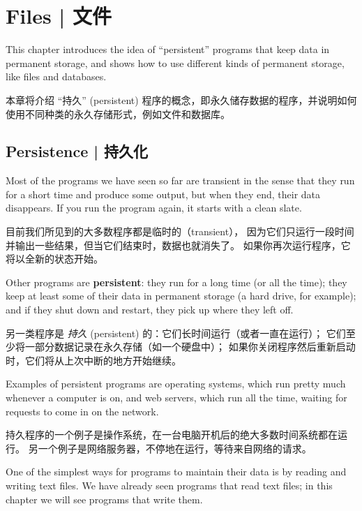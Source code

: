 

\chapter{Files  |  文件}

This chapter introduces the idea of ``persistent'' programs that
keep data in permanent storage, and shows how to use different
kinds of permanent storage, like files and databases.

本章将介绍 ``持久'' (persistent) 程序的概念，即永久储存数据的程序，并说明如何使用不同种类的永久存储形式，例如文件和数据库。

\section{Persistence  |  持久化}

    

Most of the programs we have seen so far are transient in the
sense that they run for a short time and produce some output,
but when they end, their data disappears.  If you run the program
again, it starts with a clean slate.

目前我们所见到的大多数程序都是临时的（transient），
因为它们只运行一段时间并输出一些结果，但当它们结束时，数据也就消失了。
如果你再次运行程序，它将以全新的状态开始。

Other programs are {\bf persistent}: they run for a long time
(or all the time); they keep at least some of their data
in permanent storage (a hard drive, for example); and
if they shut down and restart, they pick up where they left off.

另一类程序是 {\em 持久} (persistent) 的：它们长时间运行（或者一直在运行）；
它们至少将一部分数据记录在永久存储（如一个硬盘中）；
如果你关闭程序然后重新启动时，它们将从上次中断的地方开始继续。

Examples of persistent programs are operating systems, which
run pretty much whenever a computer is on, and web servers,
which run all the time, waiting for requests to come in on
the network.

持久程序的一个例子是操作系统，在一台电脑开机后的绝大多数时间系统都在运行。
另一个例子是网络服务器，不停地在运行，等待来自网络的请求。

One of the simplest ways for programs to maintain their data
is by reading and writing text files.  We have already seen
programs that read text files; in this chapter we will see programs
that write them.

